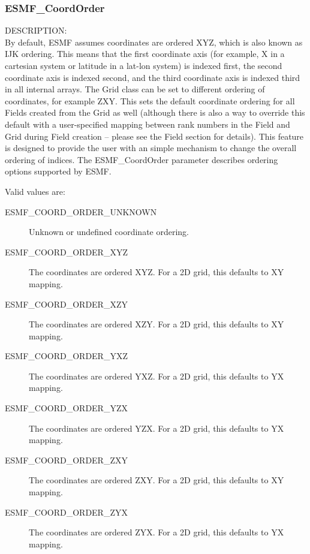 

 \subsubsection{ESMF\_CoordOrder}

 {\sf DESCRIPTION:\\}
 By default, ESMF assumes coordinates are ordered XYZ, which is also known as
 IJK ordering.  This means that the first coordinate axis (for example, X in
 a cartesian system or latitude in a lat-lon system) is indexed first, the
 second coordinate axis is indexed second, and the third coordinate axis is
 indexed third in all internal arrays.  The Grid class can be set to different
 ordering of coordinates, for example ZXY.  This sets the default coordinate
 ordering for all Fields created from the Grid as well (although there is also
 a way to override this default with a user-specified mapping between rank
 numbers in the Field and Grid during Field creation -- please see the Field
 section for details).  This feature is designed to provide the user with an
 simple mechanism to change the overall ordering of indices.  The
 {ESMF\_CoordOrder} parameter describes ordering options supported by ESMF.

 Valid values are:
 \begin{description}
    \item [ESMF\_COORD\_ORDER\_UNKNOWN]
          Unknown or undefined coordinate ordering.

    \item [ESMF\_COORD\_ORDER\_XYZ]
          The coordinates are ordered XYZ.  For a 2D grid, this defaults to
          XY mapping.

    \item [ESMF\_COORD\_ORDER\_XZY]
          The coordinates are ordered XZY.  For a 2D grid, this defaults to
          XY mapping.

    \item [ESMF\_COORD\_ORDER\_YXZ]
          The coordinates are ordered YXZ.  For a 2D grid, this defaults to
          YX mapping.

    \item [ESMF\_COORD\_ORDER\_YZX]
          The coordinates are ordered YZX.  For a 2D grid, this defaults to
          YX mapping.

    \item [ESMF\_COORD\_ORDER\_ZXY]
          The coordinates are ordered ZXY.  For a 2D grid, this defaults to
          XY mapping.

    \item [ESMF\_COORD\_ORDER\_ZYX]
          The coordinates are ordered ZYX.  For a 2D grid, this defaults to
          YX mapping.
 
 \end{description}


